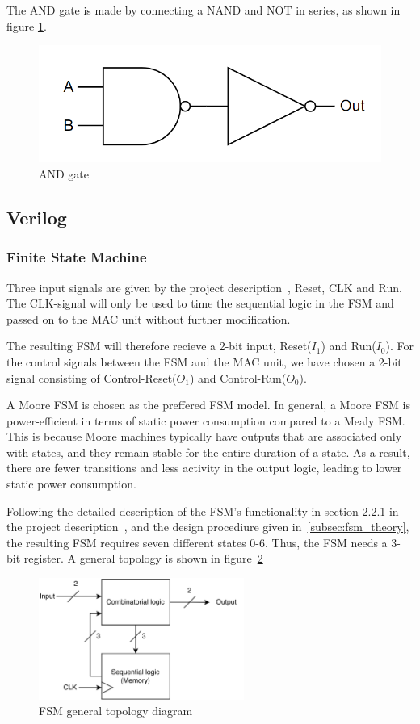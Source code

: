 The AND gate is made by connecting a NAND and NOT in series, as shown in figure \ref{fig:AND}.
\begin{figure}[H]
    \centering
    \includegraphics[width=0.4\linewidth]{Figures/And gate.png}
    \caption{AND gate}
    \label{fig:AND}
\end{figure}



\subsection{Verilog}


\subsubsection{Finite State Machine}
\label{subsec:fsm_}

Three input signals are given by the project description~\cite{project_description}, Reset, CLK and Run. The CLK-signal will only be used to time the sequential logic in the FSM and passed on to the MAC unit without further modification.

The resulting FSM will therefore recieve a 2-bit input, Reset($I_1$) and Run($I_0$). For the control signals between the FSM and the MAC unit, we have chosen a 2-bit signal consisting of Control-Reset($O_1$) and Control-Run($O_0$). 

A Moore FSM is chosen as the preffered FSM model. In general, a Moore FSM is power-efficient in terms of static power consumption compared to a Mealy FSM. This is because Moore machines typically have outputs that are associated only with states, and they remain stable for the entire duration of a state. As a result, there are fewer transitions and less activity in the output logic, leading to lower static power consumption.

Following the detailed description of the FSM's functionality in section 2.2.1 in the project description~\cite{project_description}, and the design procediure given in~\ref{subsec:fsm_theory}, the resulting FSM requires seven different states 0-6. Thus, the FSM needs a 3-bit register. A general topology is shown in figure~\ref{fig:fsm_overordnet}

\begin{figure}[H]
    \centering
    \includegraphics[width=0.6\textwidth]{Figures/FSM_overordnet.drawio.png}
    \caption{FSM general topology diagram}
    \label{fig:fsm_overordnet}
\end{figure}

